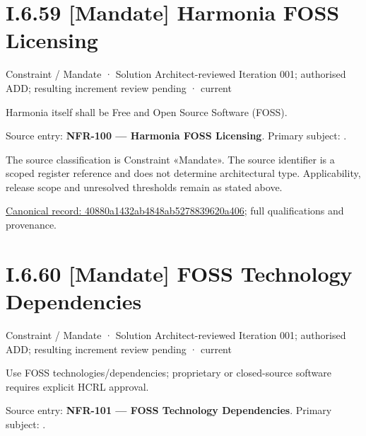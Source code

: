 \section*{I.6.59 [Mandate] Harmonia FOSS Licensing}
\label{navigation:I.6.59}

\label{element:40880a1432ab4848ab5278839620a406}
{\small Constraint / Mandate · Solution Architect-reviewed Iteration 001; authorised ADD; resulting increment review pending · current}\par

Harmonia itself shall be Free and Open Source Software (FOSS).



Source entry: \textbf{NFR-100 — Harmonia FOSS Licensing}. Primary subject: \texttt{}.



The source classification is Constraint «Mandate». The source identifier is a scoped register reference and does not determine architectural type. Applicability, release scope and unresolved thresholds remain as stated above.


{\footnotesize \href{../../../../continuum/motivation/constraint/mandate/40880a1432ab4848ab5278839620a406.md}{Canonical record: 40880a1432ab4848ab5278839620a406}; full qualifications and provenance.}\par
\section*{I.6.60 [Mandate] FOSS Technology Dependencies}
\label{navigation:I.6.60}

\label{element:13c56fcda53c406494561c883f32fc1c}
{\small Constraint / Mandate · Solution Architect-reviewed Iteration 001; authorised ADD; resulting increment review pending · current}\par

Use FOSS technologies/dependencies; proprietary or closed-source software requires explicit HCRL approval.



Source entry: \textbf{NFR-101 — FOSS Technology Dependencies}. Primary subject: \texttt{}.



